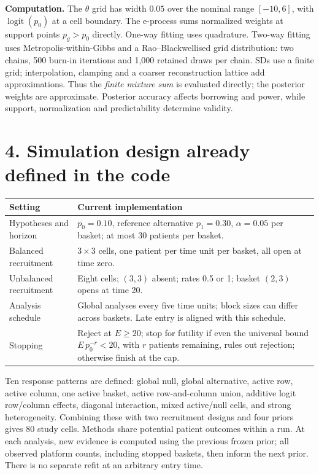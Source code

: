 \documentclass[10pt,a4paper]{article}
\newcommand{\logit}{\operatorname{logit}}
\begin{document}
\textbf{Computation.} The $\theta$ grid has width $0.05$ over the nominal
range $[-10,6]$, with $\logit(p_0)$ at a cell boundary. The e-process sums
normalized weights at support points $p_g>p_0$ directly. One-way fitting uses
quadrature. Two-way fitting uses Metropolis-within-Gibbs and a
Rao--Blackwellised grid distribution: two chains, 500 burn-in iterations and
1,000 retained draws per chain. SDs use a finite grid; interpolation,
clamping and a coarser reconstruction lattice add approximations.
Thus the \emph{finite mixture sum} is evaluated directly; the posterior
weights are approximate. Posterior accuracy affects borrowing and power,
while support, normalization and predictability determine validity.

\section*{4. Simulation design already defined in the code}
\begin{tabularx}{\linewidth}{@{}p{3.8cm}X@{}}
\toprule
Setting & Current implementation\\
\midrule
Hypotheses and horizon & $p_0=0.10$, reference alternative $p_1=0.30$, $\alpha=0.05$ per basket; at most 30 patients per basket.\\
Balanced recruitment & $3\times3$ cells, one patient per time unit per basket, all open at time zero.\\
Unbalanced recruitment & Eight cells; $(3,3)$ absent; rates 0.5 or 1; basket $(2,3)$ opens at time 20.\\
Analysis schedule & Global analyses every five time units; block sizes can differ across baskets. Late entry is aligned with this schedule.\\
Stopping & Reject at $E\ge20$; stop for futility if even the universal bound $E\,p_0^{-r}<20$, with $r$ patients remaining, rules out rejection; otherwise finish at the cap.\\
\bottomrule
\end{tabularx}

Ten response patterns are defined: global null, global alternative, active
row, active column, one active basket, active row-and-column union, additive
logit row/column effects, diagonal interaction, mixed active/null cells, and
strong heterogeneity. Combining these with two recruitment designs and four
priors gives 80 study cells. Methods share potential patient outcomes within
a run. At each analysis, new evidence is computed using the previous frozen
prior; all observed platform counts, including stopped baskets, then inform
the next prior. There is no separate refit at an arbitrary entry time.
\end{document}
